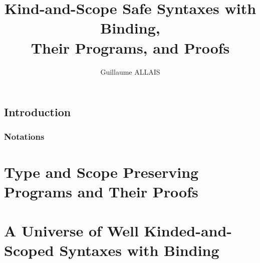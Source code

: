 \documentclass{memoir}
\title{Kind-and-Scope Safe Syntaxes with Binding, \\ Their Programs, and Proofs}
\author{Guillaume ALLAIS}
\begin{document}
\maketitle{}

\chapter{Introduction}

\section{Notations}

\label{indexed-combinators}


\part{Type and Scope Preserving Programs and Their Proofs}
\label{type-scope-semantics}


\part{A Universe of Well Kinded-and-Scoped Syntaxes with Binding}
\label{a-universe}



\end{document}

